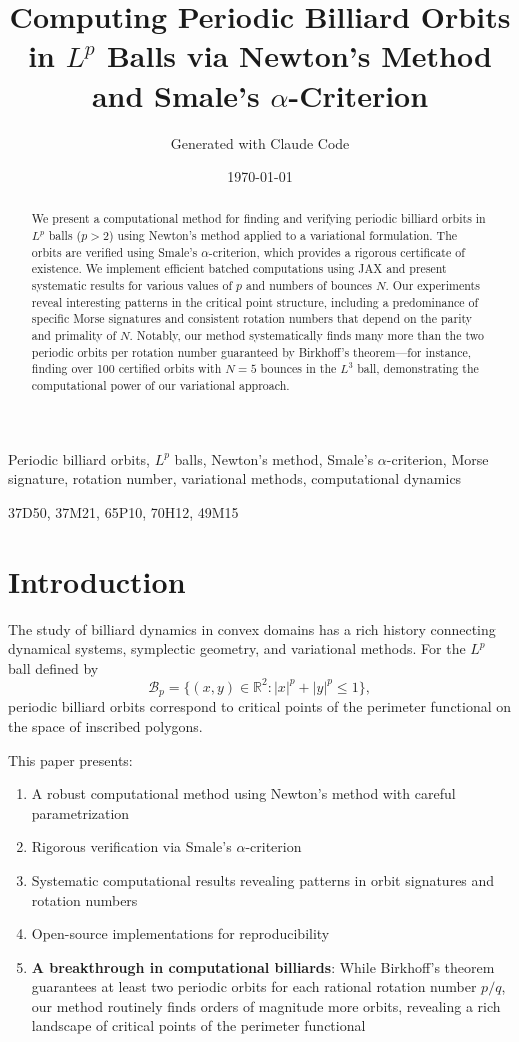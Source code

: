 \documentclass[11pt]{article}
\title{Computing Periodic Billiard Orbits in $L^p$ Balls via Newton's Method and Smale's $\alpha$-Criterion}
\author{Generated with Claude Code}
\date{\today}
\theoremstyle{plain}
\theoremstyle{definition}
\theoremstyle{remark}
\begin{document}
\maketitle

\begin{keywords}
Periodic billiard orbits, $L^p$ balls, Newton's method, Smale's $\alpha$-criterion, Morse signature, rotation number, variational methods, computational dynamics
\end{keywords}

\begin{AMS}
37D50, 37M21, 65P10, 70H12, 49M15
\end{AMS}

\begin{abstract}
We present a computational method for finding and verifying periodic billiard orbits in $L^p$ balls ($p > 2$) using Newton's method applied to a variational formulation. The orbits are verified using Smale's $\alpha$-criterion, which provides a rigorous certificate of existence. We implement efficient batched computations using JAX and present systematic results for various values of $p$ and numbers of bounces $N$. Our experiments reveal interesting patterns in the critical point structure, including a predominance of specific Morse signatures and consistent rotation numbers that depend on the parity and primality of $N$. Notably, our method systematically finds many more than the two periodic orbits per rotation number guaranteed by Birkhoff's theorem—for instance, finding over 100 certified orbits with $N=5$ bounces in the $L^3$ ball, demonstrating the computational power of our variational approach.
\end{abstract}

\section{Introduction}

The study of billiard dynamics in convex domains has a rich history connecting dynamical systems, symplectic geometry, and variational methods. For the $L^p$ ball defined by
\[
\mathcal{B}_p = \{(x,y) \in \mathbb{R}^2 : |x|^p + |y|^p \leq 1\},
\]
periodic billiard orbits correspond to critical points of the perimeter functional on the space of inscribed polygons.

This paper presents:
\begin{enumerate}
\item A robust computational method using Newton's method with careful parametrization
\item Rigorous verification via Smale's $\alpha$-criterion
\item Systematic computational results revealing patterns in orbit signatures and rotation numbers
\item Open-source implementations for reproducibility
\item \textbf{A breakthrough in computational billiards}: While Birkhoff's theorem guarantees at least two periodic orbits for each rational rotation number $p/q$, our method routinely finds orders of magnitude more orbits, revealing a rich landscape of critical points of the perimeter functional
\end{enumerate}
\end{document}
